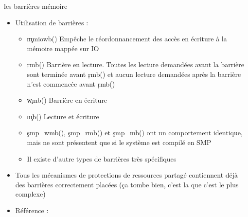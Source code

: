 \begin{frame}[fragile=singleslide]{les barrières mémoire}
  \begin{itemize}
  \item Utilisation de barrières :
    \begin{itemize}
    \item  \c{mmiowb()}  Empêche  le  réordonnancement  des  accès  en
      écriture à la mémoire mappée sur IO
    \item \c{rmb()} Barrière en  lecture. Toutes les lecture demandées
      avant la barrière sont terminée avant \c{rmb()} et aucun lecture
      demandées après la barrière n'est commencée avant \c{rmb()}
    \item \c{wmb()} Barrière en écriture
    \item \c{mb()} Lecture et écriture
    \item   \c{smp_wmb()},  \c{smp_rmb()}   et  \c{smp_mb()}   ont  un
      comportement  identique,  mais  ne  sont présentent  que  si  le
      système est compilé en SMP
    \item Il existe d'autre types de barrières très spécifiques
    \end{itemize}
  \item  Tous  les  mécanismes  de protections  de  ressources  partagé
    contiennent  déjà  des barrières  correctement  placées (ça  tombe
    bien, c'est la que c'est le plus complexe)
  \item Référence : 
  \end{itemize}
\end{frame}

